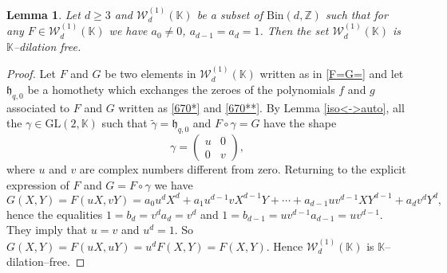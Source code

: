 \documentclass[10pt]{article}
\newtheorem{lemma}[theorem]{Lemma}
\theoremstyle{definition}
\numberwithin{equation}{section}
\newcommand {\Z}{{\mathbb{Z}}}
\newcommand {\K}{{\mathbb{K}}}
\newcommand{\Bin}{\mathrm {Bin}}
\newcommand{\GL}{\mathrm {GL}}
\begin{document}
 \begin{lemma}\label{Lemma:Wd1}
 Let $d\geqslant 3$ and $\mathcal W_d^{(1)}(\K)$ be a subset of $\Bin (d,\Z)$ such that for any $F\in \mathcal W_d^{(1)}(\K)$ we have
 $a_0\not=0$, $a_{d-1} =a_d =1$. 
 Then the set $\mathcal W_d^{(1)}(\K)$ is $\K$--dilation free. 
 \end{lemma}
 
 \begin{proof}
 Let $F$ and $G$ be two elements in $\mathcal W_d^{(1)} (\K)$ written as in \eqref{F=G=} 
and let $\mathfrak h_{q,0}$ be a homothety which exchanges the zeroes of the polynomials $f$ and $g$ associated to $F$ and $G$ written as 
\eqref{670*} and \eqref{670**}. By Lemma \ref{iso<->auto}, 
all the 
$\gamma\in {\GL}(2, \K)$ such that $\tilde \gamma = \mathfrak h_{q,0}$ and $F\circ \gamma = G$
have the shape 
\begin{equation}\label{t00u}
\gamma = \begin{pmatrix} u& 0\\ 0 & v
\end{pmatrix},
\end{equation}
where $u$ and $v$ are complex numbers different from zero. Returning to the explicit expression of $F$ and $G=F\circ \gamma$
we have 
\[
G(X,Y)=F(uX,vY)=a_0u^dX^d+a_1u^{d-1}vX^{d-1}Y+\cdots+a_{d-1}uv^{d-1}XY^{d-1}+a_dv^dY^d,
\]
hence the equalities $1=b_d = v^d a_d =v^d$ and $1= b_{d-1} =uv^{d-1} a_{d-1} =uv^{d-1}$. They imply 
that $u=v$ and $u^d=1$. So $G(X,Y) = F(uX, uY) = u^d F(X,Y) = F(X,Y)$. Hence $\mathcal W_d^{(1)} (\K)$ is $\K$--dilation--free.
 \end{proof}
 
 
 
\end{document}
